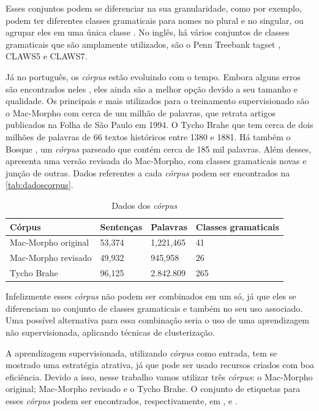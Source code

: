 Esses conjuntos podem se diferenciar na sua granularidade, como por exemplo, podem ter diferentes classes gramaticais para nomes no plural e no singular, ou agrupar eles em uma única classe \cite{fonseca2015evaluating}. No inglês, há vários conjuntos de classes gramaticais que são amplamente utilizados, são o Penn Treebank tagset \cite{penntreebank}, CLAWS5 e CLAWS7.

Já no português, os \textit{córpus} estão evoluindo com o tempo. Embora alguns erros são encontrados neles \cite{fonseca2013mac}, eles ainda são a melhor opção devido a seu tamanho e qualidade. Os principais e mais utilizados para o treinamento supervisionado são o Mac-Morpho \cite{aluisio2003account} com cerca de um milhão de palavras, que retrata artigos publicados na Folha de São Paulo em 1994. O Tycho Brahe \cite{tychobrahe2010corpus} que tem cerca de dois milhões de palavras de 66 textos históricos entre 1380 e 1881. Há também o Bosque \cite{afonso2002floresta}, um \textit{córpus} parseado que contém cerca de 185 mil palavras. Além desses, \cite{fonseca2015evaluating} apresenta uma versão revisada do Mac-Morpho, com classes gramaticais novas e junção de outras. Dados referentes a cada \textit{córpus} podem ser encontrados na \autoref{tab:dadoscorpus}.

\begin{table}[!htb]
\footnotesize
\centering
\caption{Dados dos \textit{córpus}}
\label{tab:dadoscorpus}
\begin{tabular}{m{4cm}m{2cm}m{2cm}m{4cm}}
  \toprule
  \textbf{Córpus} & \textbf{Sentenças}  & \textbf{Palavras}  & \textbf{Classes gramaticais}  \\
  \midrule
  Mac-Morpho original & 53,374 & 1,221,465 & 41  \\
  Mac-Morpho revisado & 49,932 & 945,958   & 26  \\
  Tycho Brahe         & 96,125 & 2.842.809 & 265 \\
  \bottomrule
\end{tabular}
\end{table}

Infelizmente esses \textit{córpus} não podem ser combinados em um só, já que eles se diferenciam no conjunto de classes gramaticais e também no seu uso associado. Uma possível alternativa para essa combinação seria o uso de uma aprendizagem não supervisionada, aplicando técnicas de clusterização.

A aprendizagem supervisionada, utilizando \textit{córpus} como entrada, tem se mostrado uma estratégia atrativa, já que pode ser usado recursos criados com boa eficiência. Devido a isso, nesse trabalho vamos utilizar três \textit{córpus}: o Mac-Morpho original; Mac-Morpho revisado e o Tycho Brahe. O conjunto de etiquetas para esses \textit{córpus} podem ser encontrados, respectivamente, em \cite{aluisio2003account}, \cite{fonseca2015evaluating} e \cite{tychobrahe2010corpus}.



